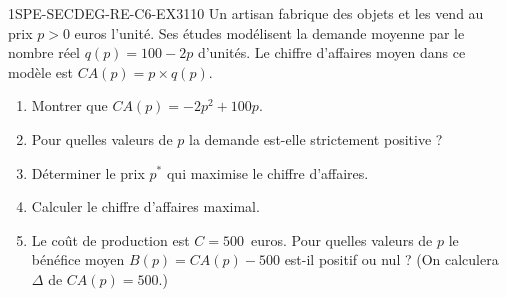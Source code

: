 
\begin{exercice}{1SPE-SECDEG-RE-C6-EX3}{1}{10}
Un artisan fabrique des objets et les vend au prix $p>0$ euros l'unité. Ses études
modélisent la demande moyenne par le nombre réel $q(p) = 100 - 2p$ d'unités.
Le chiffre d'affaires moyen dans ce modèle est $CA(p) = p \times q(p)$.
\begin{enumerate}
  \item Montrer que $CA(p) = -2p^2 + 100p$.
  \item Pour quelles valeurs de $p$ la demande est-elle strictement positive ?
  \item Déterminer le prix $p^*$ qui maximise le chiffre d'affaires.
  \item Calculer le chiffre d'affaires maximal.
  \item Le coût de production est $C = 500$~euros. Pour quelles valeurs de $p$ le bénéfice moyen $B(p) = CA(p) - 500$ est-il positif ou nul ? (On calculera $\Delta$ de $CA(p) = 500$.)
\end{enumerate}
\end{exercice}


